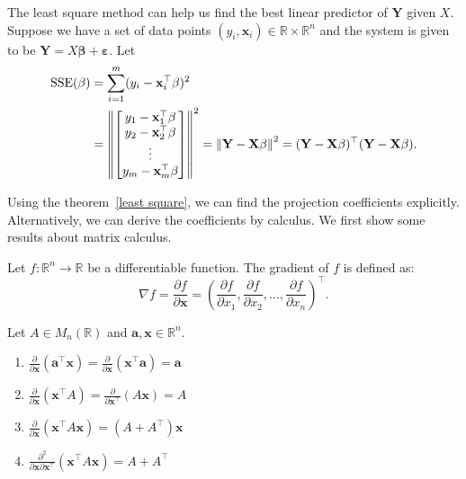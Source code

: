 \documentclass[12pt]{article}
\begin{document}
The least square method can help us find the best linear predictor of $\mathbf{Y}$ given $X$.
Suppose we have a set of data points $(y_i,\mathbf{x}_i)\in\mathbb{R}\times\mathbb{R}^n$ and the system is given to be $\mathbf{Y}=X\boldsymbol{\beta}+\boldsymbol{\varepsilon}$.
Let 
\begin{align*}
    \mathrm{SSE}(\beta) &= \sum_{i=1}^m (y_i - \mathbf{x}_i^\top\beta)^2 \\
    &= \left\| \begin{bmatrix} y_1 - \mathbf{x}_1^\top\beta \\ y_2 - \mathbf{x}_2^\top\beta \\ \vdots \\ y_m - \mathbf{x}_m^\top\beta \end{bmatrix} \right\|^2 
    = \left\lVert \mathbf{Y} - \mathbf{X}\beta \right\rVert^2
    = (\mathbf{Y} - \mathbf{X}\beta)^\top (\mathbf{Y} - \mathbf{X}\beta).
\end{align*}

Using the theorem~\eqref{least square}, we can find the projection coefficients explicitly.
Alternatively, we can derive the coefficients by calculus. We first show some results about matrix calculus.

\begin{definition}[Gradient]
Let $f: \mathbb{R}^n \to \mathbb{R}$ be a differentiable function. The gradient of $f$ is defined as:
$$ \nabla f = \frac{\partial f}{\partial \mathbf{x}} = \left( \frac{\partial f}{\partial x_1}, \frac{\partial f}{\partial x_2}, \dots, \frac{\partial f}{\partial x_n} \right)^\top.$$
\end{definition} 

\begin{theorem}
Let $A \in M_n(\mathbb{R})$ and $\mathbf{a}, \mathbf{x} \in \mathbb{R}^n$.
\begin{enumerate}
    \item $\frac{\partial}{\partial \mathbf{x}} (\mathbf{a}^\top \mathbf{x}) = \frac{\partial}{\partial \mathbf{x}} (\mathbf{x}^\top \mathbf{a}) = \mathbf{a}$
    \item $\frac{\partial}{\partial \mathbf{x}} (\mathbf{x}^\top A) = \frac{\partial}{\partial \mathbf{x}^\top} (A\mathbf{x}) = A$
    \item $\frac{\partial}{\partial \mathbf{x}} (\mathbf{x}^\top A \mathbf{x}) = (A + A^\top)\mathbf{x}$
    \item $\frac{\partial^2}{\partial \mathbf{x} \partial \mathbf{x}^\top} (\mathbf{x}^\top A \mathbf{x}) = A + A^\top$
\end{enumerate}
\end{theorem}
\end{document}
